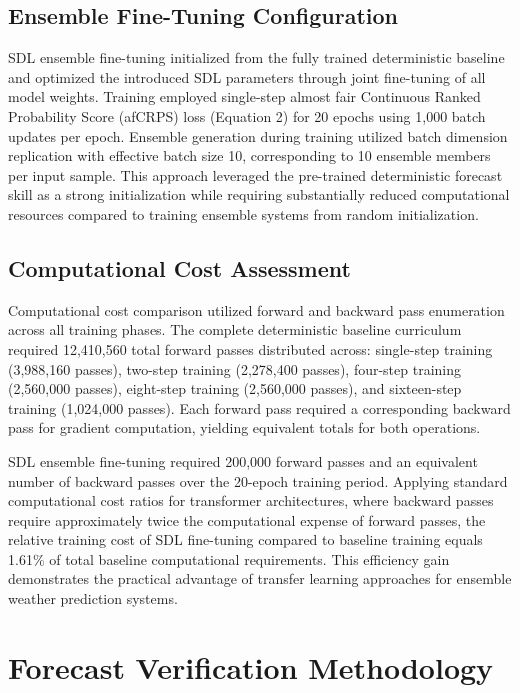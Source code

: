\documentclass[11pt]{article}
\begin{document}
\subsection{Ensemble Fine-Tuning Configuration}

SDL ensemble fine-tuning initialized from the fully trained deterministic baseline and optimized the introduced SDL parameters through joint fine-tuning of all model weights. Training employed single-step almost fair Continuous Ranked Probability Score (afCRPS) loss (Equation 2) for 20 epochs using 1,000 batch updates per epoch. Ensemble generation during training utilized batch dimension replication with effective batch size 10, corresponding to 10 ensemble members per input sample. This approach leveraged the pre-trained deterministic forecast skill as a strong initialization while requiring substantially reduced computational resources compared to training ensemble systems from random initialization.

\subsection{Computational Cost Assessment}

Computational cost comparison utilized forward and backward pass enumeration across all training phases. The complete deterministic baseline curriculum required 12,410,560 total forward passes distributed across: single-step training (3,988,160 passes), two-step training (2,278,400 passes), four-step training (2,560,000 passes), eight-step training (2,560,000 passes), and sixteen-step training (1,024,000 passes). Each forward pass required a corresponding backward pass for gradient computation, yielding equivalent totals for both operations.

SDL ensemble fine-tuning required 200,000 forward passes and an equivalent number of backward passes over the 20-epoch training period. Applying standard computational cost ratios for transformer architectures, where backward passes require approximately twice the computational expense of forward passes, the relative training cost of SDL fine-tuning compared to baseline training equals 1.61\% of total baseline computational requirements. This efficiency gain demonstrates the practical advantage of transfer learning approaches for ensemble weather prediction systems.

\section{Forecast Verification Methodology}
\label{sec:skill_details}
\end{document}
